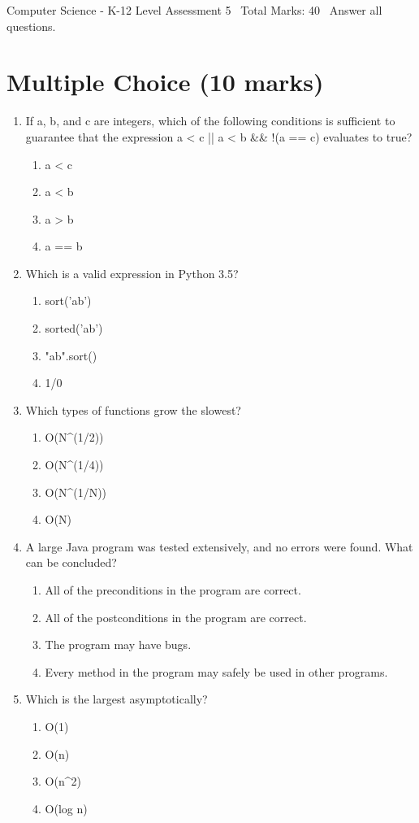 \documentclass[12pt]{article}
\begin{document}
\begin{center}
Computer Science - K-12 Level Assessment 5 \
Total Marks: 40 \
Answer all questions.
\end{center}

\section*{Multiple Choice (10 marks)}
\begin{enumerate}[label=\arabic*.]
\item If a, b, and c are integers, which of the following conditions is sufficient to guarantee
that the expression a \textless{} c || a \textless{} b \&\& !(a == c) evaluates to true?
\begin{enumerate}[label=(\alph*)]
    \item a \textless{} c
    \item a \textless{} b
    \item a \textgreater{} b
    \item a == b
\end{enumerate}
\item Which is a valid expression in Python 3.5?
\begin{enumerate}[label=(\alph*)]
    \item sort('ab')
    \item sorted('ab')
    \item "ab".sort()
    \item 1/0
\end{enumerate}
\item Which types of functions grow the slowest?
\begin{enumerate}[label=(\alph*)]
    \item O(N\^{}(1/2))
    \item O(N\^{}(1/4))
    \item O(N\^{}(1/N))
    \item O(N)
\end{enumerate}
\item A large Java program was tested extensively, and no errors were found. What can be
concluded?
\begin{enumerate}[label=(\alph*)]
    \item All of the preconditions in the program are correct.
    \item All of the postconditions in the program are correct.
    \item The program may have bugs.
    \item Every method in the program may safely be used in other programs.
\end{enumerate}
\item Which is the largest asymptotically?
\begin{enumerate}[label=(\alph*)]
    \item O(1)
    \item O(n)
    \item O(n\^{}2)
    \item O(log n)
\end{enumerate}
\end{enumerate}
\end{document}
